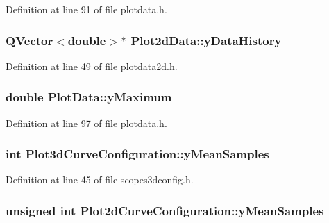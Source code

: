 \-Definition at line 91 of file plotdata.\-h.

\hypertarget{group___scope_plugin_ga3f05450290135f9d3b69ab0119718f11}{
\subsubsection[{y\-Data\-History}]{\setlength{\rightskip}{0pt plus 5cm}\-Q\-Vector$<$double$>$$\ast$ {\bf \-Plot2d\-Data\-::y\-Data\-History}}}\label{group___scope_plugin_ga3f05450290135f9d3b69ab0119718f11}


\-Definition at line 49 of file plotdata2d.\-h.

\hypertarget{group___scope_plugin_gaf9ae404a5b9a749189b4cba112eb5c18}{
\subsubsection[{y\-Maximum}]{\setlength{\rightskip}{0pt plus 5cm}double {\bf \-Plot\-Data\-::y\-Maximum}}}\label{group___scope_plugin_gaf9ae404a5b9a749189b4cba112eb5c18}


\-Definition at line 97 of file plotdata.\-h.

\hypertarget{group___scope_plugin_ga917daaa3cc944ff8bd9e8ae6ed1cfc3b}{
\subsubsection[{y\-Mean\-Samples}]{\setlength{\rightskip}{0pt plus 5cm}int {\bf \-Plot3d\-Curve\-Configuration\-::y\-Mean\-Samples}}}\label{group___scope_plugin_ga917daaa3cc944ff8bd9e8ae6ed1cfc3b}


\-Definition at line 45 of file scopes3dconfig.\-h.

\hypertarget{group___scope_plugin_gabe6fab440d33b0a9cb4ad4db2950c26d}{
\subsubsection[{y\-Mean\-Samples}]{\setlength{\rightskip}{0pt plus 5cm}unsigned int {\bf \-Plot2d\-Curve\-Configuration\-::y\-Mean\-Samples}}}\label{group___scope_plugin_gabe6fab440d33b0a9cb4ad4db2950c26d}


